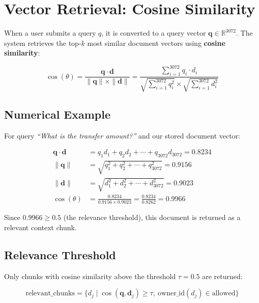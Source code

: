 \section{Vector Retrieval: Cosine Similarity}

When a user submits a query $q$, it is converted to a query vector $\mathbf{q} \in \mathbb{R}^{3072}$. The system retrieves the top-$k$ most similar document vectors using \textbf{cosine similarity}:

\begin{equation}
\boxed{\cos(\theta) = \frac{\mathbf{q} \cdot \mathbf{d}}{\|\mathbf{q}\| \times \|\mathbf{d}\|} = \frac{\sum_{i=1}^{3072} q_i \cdot d_i}{\sqrt{\sum_{i=1}^{3072} q_i^2} \times \sqrt{\sum_{i=1}^{3072} d_i^2}}}
\label{eq:cosine}
\end{equation}

\subsection{Numerical Example}

For query \textit{``What is the transfer amount?''} and our stored document vector:

\begin{align}
\mathbf{q} \cdot \mathbf{d} &= q_1 d_1 + q_2 d_2 + \cdots + q_{3072} d_{3072} = 0.8234 \\
\|\mathbf{q}\| &= \sqrt{q_1^2 + q_2^2 + \cdots + q_{3072}^2} = 0.9156 \\
\|\mathbf{d}\| &= \sqrt{d_1^2 + d_2^2 + \cdots + d_{3072}^2} = 0.9023 \\
\cos(\theta) &= \frac{0.8234}{0.9156 \times 0.9023} = \frac{0.8234}{0.8262} = 0.9966
\end{align}

Since $0.9966 \geq 0.5$ (the relevance threshold), this document is returned as a relevant context chunk.

\subsection{Relevance Threshold}

Only chunks with cosine similarity above the threshold $\tau = 0.5$ are returned:

\begin{equation}
\text{relevant\_chunks} = \{d_j \mid \cos(\mathbf{q}, \mathbf{d}_j) \geq \tau,\ \text{owner\_id}(d_j) \in \text{allowed}\}
\end{equation}

